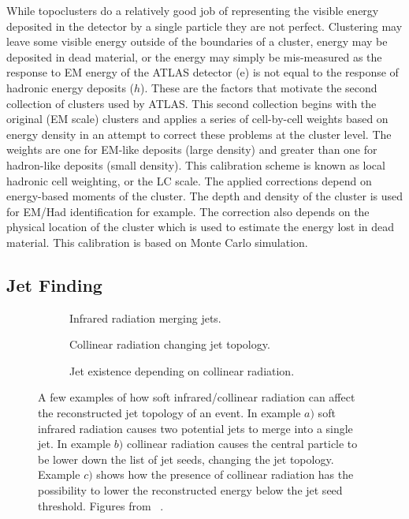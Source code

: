  
While topoclusters do a relatively good job of representing the visible energy deposited in the detector by a single particle they are not perfect.  
Clustering may leave some visible energy outside of the boundaries of a cluster, energy may be deposited in dead material, or the energy may simply be mis-measured as the response to EM energy of the ATLAS detector (e) is not equal to the response of hadronic energy deposits ($h$).  
These are the factors that motivate the second collection of clusters used by ATLAS.  
This second collection begins with the original (EM scale) clusters and applies a series of cell-by-cell weights based on energy density in an attempt to correct these problems at the cluster level.  
The weights are one for EM-like deposits (large density) and greater than one for hadron-like deposits (small density).  
This calibration scheme is known as local hadronic cell weighting, or the LC scale.  
The applied corrections depend on energy-based moments of the cluster.  
The depth and density of the cluster is used for EM/Had identification for example.  
The correction also depends on the physical location of the cluster which is used to estimate the energy lost in dead material.  
This calibration is based on Monte Carlo simulation.   

\subsection{Jet Finding}
\label{Sec:JetFinding}
\begin{figure}[!ht]
 \centering
 \begin{subfigure}{.5\textwidth}
  \centering
  \caption{Infrared radiation merging jets.}
 \end{subfigure}%
 \begin{subfigure}{.5\textwidth}
  \centering
  \caption{Collinear radiation changing jet topology.}
 \end{subfigure}
 \begin{subfigure}{.5\textwidth}
  \centering
  \caption{Jet existence depending on collinear radiation.}
 \end{subfigure}
 \caption[Effect of radiation on jet building.]
  {A few examples of how soft infrared/collinear radiation can affect the reconstructed jet topology of an event.  In example $a)$ soft infrared radiation causes two potential jets to merge into a single jet.  In example $b)$ collinear radiation causes the central particle to be lower down the list of jet seeds, changing the jet topology.  Example $c)$ shows how the presence of collinear radiation has the possibility to lower the reconstructed energy below the jet seed threshold.  Figures from ~\cite{Blazey:2000qt}. }
 \label{Fig:IRCoSafety}
\end{figure}

